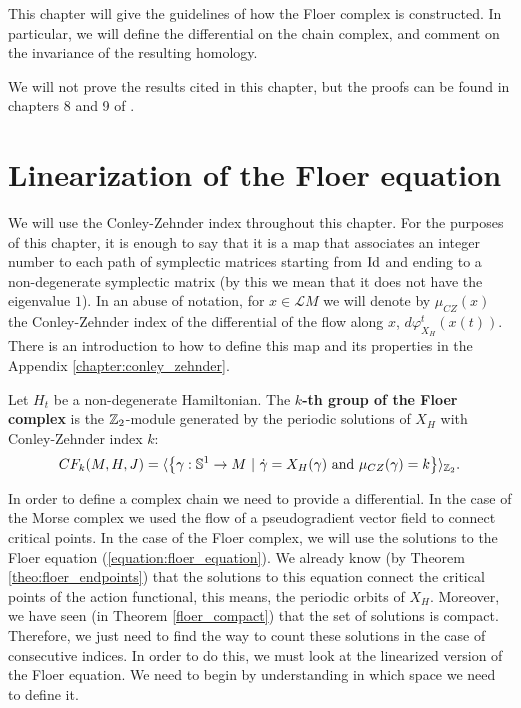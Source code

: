 This chapter will give the guidelines of how the Floer complex is constructed. In particular, we will define the differential on the chain complex, and comment on the invariance of the resulting homology.

We will not prove the results cited in this chapter, but the proofs can be found in chapters 8 and 9 of \cite{audin2014morse}.

\section{Linearization of the Floer equation}

We will use the Conley-Zehnder index throughout this chapter. For the purposes of this chapter, it is enough to say that it is a map that associates an integer number to each path of symplectic matrices starting from $\mathrm{Id}$ and ending to a non-degenerate symplectic matrix (by this we mean that it does not have the eigenvalue $1$). In an abuse of notation, for $x \in \mathcal{L}M$ we will denote by $\mu_{CZ}(x)$ the Conley-Zehnder index of the differential of the flow along $x$, $d\varphi_{X_H}^t(x(t))$. There is an introduction to how to define this map and its properties in the Appendix \ref{chapter:conley_zehnder}.

\begin{deff} \label{deff:floer_complex}
Let $H_t$ be a non-degenerate Hamiltonian. The {\bf $k$-th group of the Floer complex} is the $\mathbb{Z}_2$-module generated by the periodic solutions of $X_H$ with Conley-Zehnder index $k$:
\[CF_k(M,H,J) = \langle \left\{ \gamma : \mathbb{S}^1 \rightarrow M \ | \ \dot{\gamma} = X_H(\gamma) \text{ and } \mu_{CZ}(\gamma) = k \right\} \rangle_{\mathbb{Z}_2} .\]
\end{deff}

In order to define a complex chain we need to provide a differential. In the case of the Morse complex we used the flow of a pseudogradient vector field to connect critical points. In the case of the Floer complex, we will use the solutions to the Floer equation (\ref{equation:floer_equation}). We already know (by Theorem \ref{theo:floer_endpoints}) that the solutions to this equation connect the critical points of the action functional, this means, the periodic orbits of $X_H$. Moreover, we have seen (in Theorem \ref{floer_compact}) that the set of solutions is compact. Therefore, we just need to find the way to count these solutions in the case of consecutive indices. In order to do this, we must look at the linearized version of the Floer equation. We need to begin by understanding in which space we need to define it.

